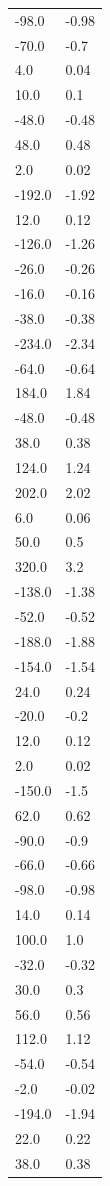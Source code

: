 \begin{longtable}{ll}
-98.0 & -0.98 \\
-70.0 & -0.7 \\
4.0 & 0.04 \\
10.0 & 0.1 \\
-48.0 & -0.48 \\
48.0 & 0.48 \\
2.0 & 0.02 \\
-192.0 & -1.92 \\
12.0 & 0.12 \\
-126.0 & -1.26 \\
-26.0 & -0.26 \\
-16.0 & -0.16 \\
-38.0 & -0.38 \\
-234.0 & -2.34 \\
-64.0 & -0.64 \\
184.0 & 1.84 \\
-48.0 & -0.48 \\
38.0 & 0.38 \\
124.0 & 1.24 \\
202.0 & 2.02 \\
6.0 & 0.06 \\
50.0 & 0.5 \\
320.0 & 3.2 \\
-138.0 & -1.38 \\
-52.0 & -0.52 \\
-188.0 & -1.88 \\
-154.0 & -1.54 \\
24.0 & 0.24 \\
-20.0 & -0.2 \\
12.0 & 0.12 \\
2.0 & 0.02 \\
-150.0 & -1.5 \\
62.0 & 0.62 \\
-90.0 & -0.9 \\
-66.0 & -0.66 \\
-98.0 & -0.98 \\
14.0 & 0.14 \\
100.0 & 1.0 \\
-32.0 & -0.32 \\
30.0 & 0.3 \\
56.0 & 0.56 \\
112.0 & 1.12 \\
-54.0 & -0.54 \\
-2.0 & -0.02 \\
-194.0 & -1.94 \\
22.0 & 0.22 \\
38.0 & 0.38 \\

\end{longtable}
